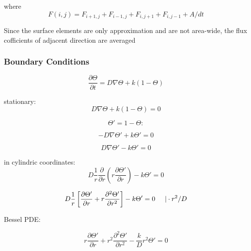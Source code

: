 where 
\begin{equation}
F(i,j) = F_{i+1,j} + F_{i-1,j} + F_{i,j+1} + F_{i,j-1} + A/dt
\end{equation}

Since the surface elements are only approximation and are not area-wide, the flux cofficients of adjacent direction are averaged

\subsubsection{Boundary Conditions}
\begin{equation}
\frac{\partial \Theta}{\partial t} = D\nabla\Theta + k(1-\Theta)
\end{equation}

stationary:\\

\begin{equation}
D\nabla\Theta + k(1-\Theta) = 0
\end{equation}

\begin{equation}
\Theta' = 1 - \Theta:
\end{equation}

\begin{equation}
-D\nabla\Theta' + k\Theta' = 0
\end{equation}

\begin{equation}
D\nabla\Theta' - k\Theta' = 0
\end{equation}

in cylindric coordinates:\\

\begin{equation}
D\frac{1}{r}\frac{\partial}{\partial r}(r\frac{\partial \Theta'}{\partial r}) - k\Theta'  = 0
\end{equation}

\begin{equation}
D\frac{1}{r}\left[\frac{\partial\Theta'}{\partial r} + r\frac{\partial^2\Theta'}{\partial r^2}\right] - k\Theta' = 0 \hspace{0.5cm} |\cdot r^2/D
\end{equation}

Bessel PDE:

\begin{equation}
r\frac{\partial\Theta'}{\partial r} + r^2\frac{\partial^2\Theta'}{\partial r^2} - \frac{k}{D}r^2\Theta' = 0
\end{equation}

